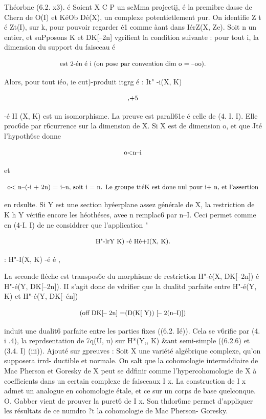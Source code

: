\documentclass[11pt]{article}
\theoremstyle{remark}
\begin{document}
Théorbne (6.2. x3). é Soient X C P un scMma projectij, é la premibre dasse de Chern de O(I) et KéOb Dé(X), un complexe potentietlement pur. On identifie Z t é Zt(I), sur k, pour pouvoir regarder é1 comme àant dans IérZ(X, Ze). Soit n un entier, et suPposons K et DK[--2n] vgrifient la condition suivante : pour tout i, la dimension du support du faisceau é

\[\text{\small est 2-én é i (on pose par convention dim o = --oo).}\]

Alors, pour tout iéo, ie cut)-produit itgrg é : It" -i(X, K)

\[\text{\small ,+5}\]

-é II (X, K) est un isomorphisme. La preuve est parall61e é celle de (4. I. I). Elle proc6de par r6currence sur la dimension de X. Si X est de dimension o, et que Jté l'hypoth6se donne

\[\text{\small o<n--i}\]

et

\[\text{\small o< n--(-i + 2n) = i--n, soit i = n. Le groupe ttéK est done nul pour i+ n, et l'assertion}\]

en rdsulte. Si Y est une section hyéerplane assez générale de X, la restriction de K h Y vérifie encore les héothéses, avee n remplac6 par n--I. Ceci permet comme en (4-I. I) de ne considdrer que l'application "

\[\text{\small H"-lrY K) -é Hé+I(X, K).}\]

: H"-I(X, K) -é é ,

La seconde fléche est transpos6e du morphisme de restriction H"-é(X, DK[--2n]) é H"-é(Y, DK[--2n]). II s'agit donc de vdrifier que la dualitd parfaite entre H"-é(Y, K) et H"-é(Y, DK[--én])

\[\text{\small (off DK[-- 2n] =(D(K[ Y)) [-- 2(n--I)])}\]

induit une dualit6 parfaite entre les parties fixes ((6.2. Ié)). Cela se v6rifie par (4. i .4), la reprdsentation de 7q(U, u) sur H*(Y,, K) \&ant semi-simple ((6.2.6) et (3.4. I) (iii)). Ajouté sur gpreuves : Soit X une variété algébrique complexe, qu'on supposera irrd- ductible et normale. On salt que la cohomologie intermddiaire de Mac Pherson et Goresky de X peut se ddfinir comme l'hypercohomologie de X à coefficients dans un certain complexe de faisceaux I x. La construction de I x admet un analogue en cohomologie étale, et ce sur un corps de base quelconque. O. Gabber vient de prouver la puret6 de I x. Son thdor6me permet d'appliquer les résultats de ce numdro ?t la cohomologie de Mac Pherson- Goresky.
\end{document}
